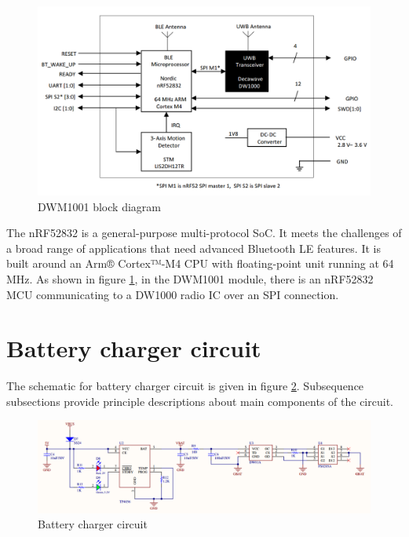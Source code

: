 \documentclass[\main/main.tex]{subfiles}
\begin{document}
\begin{figure}[H]
    \begin{center}
        \includegraphics[scale=0.3]{dwm1001_block_diagram.png}
    \end{center}
    \caption{DWM1001 block diagram}
    \label{fig:dwm1001_block_diagram}
\end{figure}

The nRF52832 is a general-purpose multi-protocol SoC. It meets the challenges of a broad range of applications that need advanced Bluetooth LE features. It is built around an Arm® Cortex™-M4 CPU with floating-point unit running at 64 MHz. As shown in figure \ref{fig:dwm1001_block_diagram}, in the DWM1001 module, there is an nRF52832 MCU communicating to  a DW1000 radio IC over an SPI connection.

\section{Battery charger circuit}
The schematic for battery charger circuit is given in figure \ref{fig:battery_charger_circuit}. Subsequence subsections provide principle descriptions about main components of the circuit.
\begin{figure}[H]
    \begin{center}
        \includegraphics[width=1\textwidth]{battery_charger_circuit.png}
    \end{center}
    \caption{Battery charger circuit}
    \label{fig:battery_charger_circuit}
\end{figure}
\end{document}

